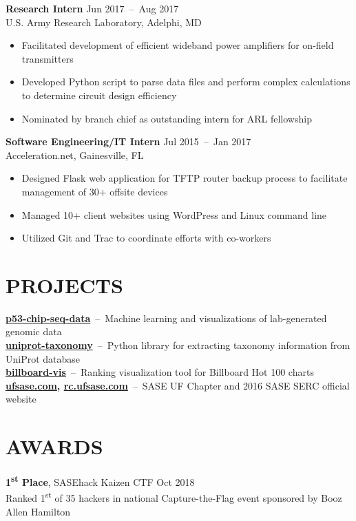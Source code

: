 \documentclass[line,resmargin]{res}
\begin{document}
\begin{resume}
    \textbf{Research Intern}    \hfill Jun 2017~--~Aug 2017 \\
    U.S. Army Research Laboratory, Adelphi, MD
    \begin{itemize}  \itemsep -2pt
        \item Facilitated development of efficient wideband power amplifiers for on-field transmitters
        \item Developed Python script to parse data files and perform complex calculations to determine circuit design efficiency
        \item Nominated by branch chief as outstanding intern for ARL fellowship
    \end{itemize}

    \textbf{Software Engineering/IT Intern}    \hfill Jul 2015~--~Jan 2017 \\
    Acceleration.net, Gainesville, FL
    \begin{itemize}  \itemsep -2pt
        \item Designed Flask web application for TFTP router backup process to facilitate management of 30+ offsite devices
        \item Managed 10+ client websites using WordPress and Linux command line
        \item Utilized Git and Trac to coordinate efforts with co-workers
    \end{itemize}

\section{PROJECTS}
    \textbf{\href{https://github.com/zhoulab/p53-chip-seq-data}{p53-chip-seq-data}}~--~Machine learning and visualizations of lab-generated genomic data \\
    \textbf{\href{https://github.com/zhoulab/uniprot-taxonomy}{uniprot-taxonomy}}~--~Python library for extracting taxonomy information from UniProt database \\
    \textbf{\href{http://victorl.in/billboard-vis}{billboard-vis}}~--~Ranking visualization tool for Billboard Hot 100 charts \\
    \textbf{\href{http://ufsase.com}{ufsase.com}, \href{http://rc.ufsase.com}{rc.ufsase.com}}~--~SASE UF Chapter and 2016 SASE SERC official website

\section{AWARDS}
    \textbf{1\textsuperscript{st} Place}, SASEhack Kaizen CTF    \hfill Oct 2018 \\
    Ranked 1\textsuperscript{st} of 35 hackers in national Capture-the-Flag event sponsored by Booz Allen Hamilton


\end{resume}
\end{document}
